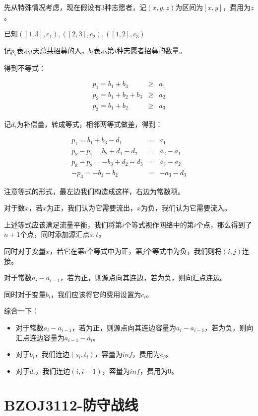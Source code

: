 \documentclass{ctexart}
\numberwithin{equation}{section}
\begin{document}
\begin{flushleft}
  先从特殊情况考虑，现在假设有$3$种志愿者，记$(x,y,z)$为区间为$[x,y]$，费用为$z$。

  已知$([1,3],c_1),([2,3],c_2),([1,2],c_3)$

  记$p_i$表示$i$天总共招募的人，$b_i$表示第$i$种志愿者招募的数量。

  得到不等式：

  \begin{eqnarray*} 
    p_1=b_1+b_3 &\ge& a_1 \\
    p_2=b_1+b_2+b_3 &\ge& a_2 \\
    p_3=b_1+b_2 &\ge& a_3
  \end{eqnarray*}

  记$d_i$为补偿量，转成等式，相邻两等式做差，得到：

  \begin{eqnarray*} 
    p_1 = b_1+b_3-d_1 &=& a_1 \\
    p_2-p_1 = b_2+d_1-d_2 &=& a_2-a_1 \\
    p_3-p_2 = -b_3+d_2-d_3 &=& a_3-a_2 \\
    -p_3 = -b_1-b_2 &=& -a_3-d_3 
  \end{eqnarray*}

  注意等式的形式，最左边我们构造成这样，右边为常数项。

  对于数$x$，若$x$为正，我们认为它需要流出，$x$为负，我们认为它需要流入。

  上述等式应该满足流量平衡，我们将第$i$个等式视作网络中的第$i$个点，那么得到了$n+1$个点，同时添加源汇点$s,t$。
  
  同时对于变量$x$，若它在第$i$个等式中为正，第$j$个等式中为负，我们则将$(i,j)$连接。

  对于常数$a_i-a_{i-1}$，若为正，则源点向其连边，若为负，则向汇点连边。
  
  同时对于变量$b_i$，我们应该将它的费用设置为$c_i$。

  \newpage
  
  综合一下：

  \begin{itemize}
  \item 对于常数$a_i-a_{i-1}$，若为正，则源点向其连边容量为$a_i-a_{i-1}$，若为负，则向汇点连边容量为$a_{i-1}-a_i$。
  \item 对于$b_i$，我们连边$(s_i,t_i)$，容量为$inf$，费用为$c_i$。
  \item 对于$d_i$，我们连边$(i,i-1)$，容量为$inf$，费用为$0$。
  \end{itemize} 
  \newpage

  \section{BZOJ3112-防守战线}

\end{flushleft}
\end{document}
